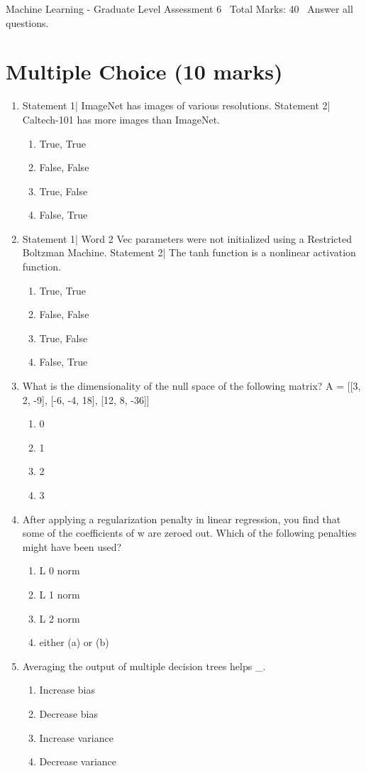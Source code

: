 \documentclass[12pt]{article}
\begin{document}
\begin{center}
Machine Learning - Graduate Level Assessment 6 \
Total Marks: 40 \
Answer all questions.
\end{center}

\section*{Multiple Choice (10 marks)}
\begin{enumerate}[label=\arabic*.]
\item Statement 1| ImageNet has images of various resolutions. Statement 2| Caltech-101 has more images than ImageNet.
\begin{enumerate}[label=(\alph*)]
    \item True, True
    \item False, False
    \item True, False
    \item False, True
\end{enumerate}
\item Statement 1| Word 2 Vec parameters were not initialized using a Restricted Boltzman Machine. Statement 2| The tanh function is a nonlinear activation function.
\begin{enumerate}[label=(\alph*)]
    \item True, True
    \item False, False
    \item True, False
    \item False, True
\end{enumerate}
\item What is the dimensionality of the null space of the following matrix? A = [[3, 2, -9], [-6, -4, 18], [12, 8, -36]]
\begin{enumerate}[label=(\alph*)]
    \item 0
    \item 1
    \item 2
    \item 3
\end{enumerate}
\item After applying a regularization penalty in linear regression, you find that some of the coefficients of w are zeroed out. Which of the following penalties might have been used?
\begin{enumerate}[label=(\alph*)]
    \item L 0 norm
    \item L 1 norm
    \item L 2 norm
    \item either (a) or (b)
\end{enumerate}
\item Averaging the output of multiple decision trees helps \_.
\begin{enumerate}[label=(\alph*)]
    \item Increase bias
    \item Decrease bias
    \item Increase variance
    \item Decrease variance
\end{enumerate}
\end{enumerate}
\end{document}
